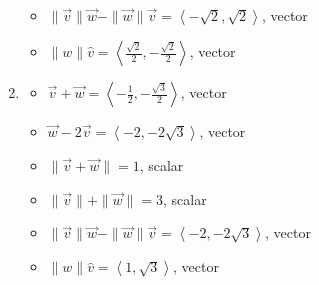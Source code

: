 \documentclass{ximera}
\begin{document}
\begin{enumerate}
\begin{multicols}{2}
\begin{itemize}
\end{itemize}

\end{multicols}

\begin{multicols}{2}

\begin{itemize}

\item $\| \vec{v} \| \vec{w} - \| \vec{w} \| \vec{v}  = \left<-\sqrt{2},\sqrt{2}\right>$, vector
\item $\|w\| \hat{v}= \left<\frac{\sqrt{2}}{2}, -\frac{\sqrt{2}}{2} \right>$, vector

\end{itemize}

\end{multicols}

\pagebreak

\item  

\begin{multicols}{2}

\begin{itemize}

\item  $\vec{v} + \vec{w} = \left<-\frac{1}{2}, -\frac{\sqrt{3}}{2}\right> $, vector
\item  $\vec{w}  - 2\vec{v}  = \left<-2, -2\sqrt{3} \right>$, vector

\end{itemize}

\end{multicols}

\begin{multicols}{2}

\begin{itemize}

\item $\| \vec{v} + \vec{w} \| = 1$, scalar
\item  $\| \vec{v} \| + \| \vec{w}\| = 3$, scalar

\end{itemize}

\end{multicols}

\begin{multicols}{2}

\begin{itemize}

\item $\| \vec{v} \| \vec{w} - \| \vec{w} \| \vec{v}  = \left<-2,-2\sqrt{3}\right>$, vector
\item $\|w\| \hat{v}= \left<1, \sqrt{3} \right>$, vector


\end{itemize}
\end{multicols}
\end{enumerate}
\end{document}
